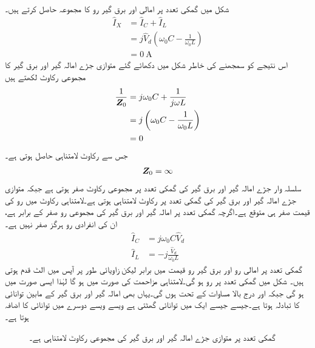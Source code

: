 شکل  میں گمکی تعدد پر امالی اور برق گیر رو کا مجموعہ حاصل کرتے ہیں۔
\begin{align*}
\hat{I}_X&=\hat{I}_C+\hat{I}_L\\
&=j \hat{V}_d\left(\omega_0 C -\frac{1}{\omega_0 L}\right)\\
&=\SI{0}{\ampere}
\end{align*}
اس نتیجے کو سمجھنے کی خاطر  شکل  میں دکھائے گئے متوازی جڑے امالہ گیر اور برق گیر کا مجموعی رکاوٹ  لکھتے ہیں
\begin{align*}
\frac{1}{{{\boldsymbol{Z}}}_0}&=j\omega_0 C +\frac{1}{j\omega L}\\
&=j\left(\omega_0 C-\frac{1}{\omega_0 L}\right)\\
&=0
\end{align*}
جس سے  رکاوٹ لامتناہی حاصل ہوتی ہے۔
\begin{align}
{\ensuremath{{\boldsymbol{Z}}}}_0=\infty
\end{align}
سلسلہ وار جڑے امالہ گیر اور برق گیر کی گمکی تعدد پر مجموعی رکاوٹ صفر ہوتی ہے جبکہ متوازی جڑے امالہ گیر اور برق گیر کی گمکی تعدد پر رکاوٹ لامتناہی ہوتی ہے۔لامتناہی رکاوٹ میں رو کی قیمت صفر ہی متوقع ہے۔اگرچہ گمکی تعدد پر امالہ گیر اور برق گیر کی مجموعی رو صفر کے برابر ہے، ان کی انفرادی رو ہرگز صفر نہیں ہے۔
\begin{align*}
\hat{I}_C&=j\omega_0 C \hat{V}_d\\
\hat{I}_L&=-j\frac{\hat{V}_d}{\omega_0 L}
\end{align*} 
گمکی تعدد پر امالی رو اور برق گیر رو قیمت میں برابر لیکن زاویائی طور پر آپس میں الٹ قدم  ہوتی ہیں۔ شکل  میں گمکی تعدد پر رو  ہو گی۔لامتناہی مزاحمت کی صورت میں  ہو گا لہٰذا ایسی صورت میں  ہو گی جبکہ  اور  درج بالا مساوات کے تحت ہوں گی۔یہاں بھی امالہ گیر اور برق گیر کے مابین توانائی کا تبادلہ ہوتا ہے۔جیسے جیسے ایک میں توانائی گھٹتی ہے ویسے ویسے دوسرے میں توانائی کا اضافہ ہوتا ہے۔
%
\begin{figure}
\centering
{}
\caption{گمکی تعدد پر متوازی جڑے امالہ گیر اور برق گیر کی مجموعی رکاوٹ لامتناہی ہے۔}
\label{شکل_تعددی_گمکی_تعدد_متوازی_رکاوٹ}
\end{figure}

